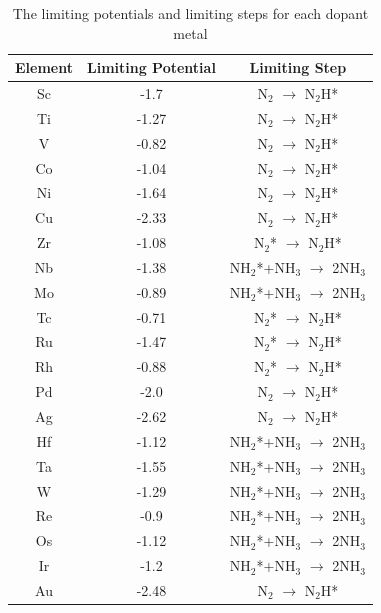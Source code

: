 \begin{table}
\begin{center}
\begin{tabular}{| c | c |c |}
\hline
Element & Limiting Potential & Limiting Step \\
\hline
Sc & -1.7 & N$_2$ $\rightarrow$ N$_2$H*\\
Ti & -1.27 & N$_2$ $\rightarrow$ N$_2$H*\\
V & -0.82 & N$_2$ $\rightarrow$ N$_2$H*\\
Co & -1.04 & N$_2$ $\rightarrow$ N$_2$H*\\
Ni & -1.64 & N$_2$ $\rightarrow$ N$_2$H*\\
Cu & -2.33 & N$_2$ $\rightarrow$ N$_2$H*\\
Zr & -1.08 & N$_2$* $\rightarrow$ N$_2$H*\\
Nb & -1.38 & NH$_2$*+NH$_3$ $\rightarrow$ 2NH$_3$\\
Mo & -0.89 & NH$_2$*+NH$_3$ $\rightarrow$ 2NH$_3$\\
Tc & -0.71 & N$_2$* $\rightarrow$ N$_2$H*\\
Ru & -1.47 & N$_2$* $\rightarrow$ N$_2$H*\\
Rh & -0.88 & N$_2$* $\rightarrow$ N$_2$H*\\
Pd & -2.0 & N$_2$ $\rightarrow$ N$_2$H*\\
Ag & -2.62 & N$_2$ $\rightarrow$ N$_2$H*\\
Hf & -1.12 & NH$_2$*+NH$_3$ $\rightarrow$ 2NH$_3$\\
Ta & -1.55 & NH$_2$*+NH$_3$ $\rightarrow$ 2NH$_3$\\
W & -1.29 & NH$_2$*+NH$_3$ $\rightarrow$ 2NH$_3$\\
Re & -0.9 & NH$_2$*+NH$_3$ $\rightarrow$ 2NH$_3$\\
Os & -1.12 & NH$_2$*+NH$_3$ $\rightarrow$ 2NH$_3$\\
Ir & -1.2 & NH$_2$*+NH$_3$ $\rightarrow$ 2NH$_3$\\
Au & -2.48 & N$_2$ $\rightarrow$ N$_2$H*\\
\hline
\end{tabular}
\end{center}
\caption{The limiting potentials and limiting steps for each dopant metal}\label{table:limiting_steps}\end{table}\begin{figure}
\centering

\end{figure}
